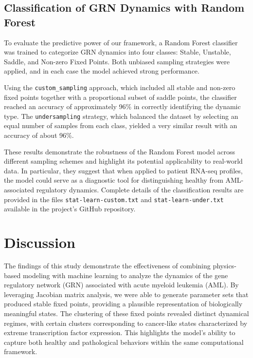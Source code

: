 \documentclass[a4paper,12pt]{article}
\begin{document}
\subsection{Classification of GRN Dynamics with Random Forest}
To evaluate the predictive power of our framework, a Random Forest classifier was trained to categorize GRN dynamics into four classes: Stable, Unstable, Saddle, and Non-zero Fixed Points. Both unbiased sampling strategies were applied, and in each case the model achieved strong performance. 

Using the \texttt{custom\_sampling} approach, which included all stable and non-zero fixed points together with a proportional subset of saddle points, the classifier reached an accuracy of approximately 96\% in correctly identifying the dynamic type. The \texttt{undersampling} strategy, which balanced the dataset by selecting an equal number of samples from each class, yielded a very similar result with an accuracy of about 96\%. 

These results demonstrate the robustness of the Random Forest model across different sampling schemes and highlight its potential applicability to real-world data. In particular, they suggest that when applied to patient RNA-seq profiles, the model could serve as a diagnostic tool for distinguishing healthy from AML-associated regulatory dynamics. Complete details of the classification results are provided in the files \texttt{stat-learn-custom.txt} and \texttt{stat-learn-under.txt} available in the project’s GitHub repository.


\section{Discussion}
The findings of this study demonstrate the effectiveness of combining physics-based modeling with machine learning to analyze the dynamics of the gene regulatory network (GRN) associated with acute myeloid leukemia (AML). By leveraging Jacobian matrix analysis, we were able to generate parameter sets that produced stable fixed points, providing a plausible representation of biologically meaningful states. The clustering of these fixed points revealed distinct dynamical regimes, with certain clusters corresponding to cancer-like states characterized by extreme transcription factor expression. This highlights the model’s ability to capture both healthy and pathological behaviors within the same computational framework.
\end{document}
